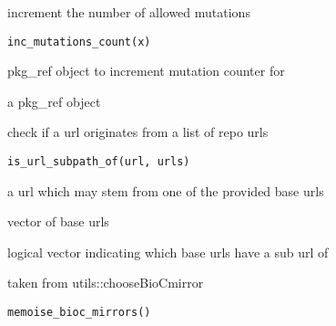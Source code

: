 \documentclass[a4paper]{book}
\begin{document}
%
\begin{Description}
increment the number of allowed mutations
\end{Description}
%
\begin{Usage}
\begin{verbatim}
inc_mutations_count(x)
\end{verbatim}
\end{Usage}
%
\begin{Arguments}
\begin{ldescription}
\item[\code{x}] pkg\_ref object to increment mutation counter for
\end{ldescription}
\end{Arguments}
%
\begin{Value}
a pkg\_ref object
\end{Value}
%
\begin{Description}
check if a url originates from a list of repo urls
\end{Description}
%
\begin{Usage}
\begin{verbatim}
is_url_subpath_of(url, urls)
\end{verbatim}
\end{Usage}
%
\begin{Arguments}
\begin{ldescription}
\item[\code{url}] a url which may stem from one of the provided base urls

\item[\code{urls}] vector of base urls
\end{ldescription}
\end{Arguments}
%
\begin{Value}
logical vector indicating which base urls have a sub url of
\end{Value}
%
\begin{Description}
taken from utils::chooseBioCmirror
\end{Description}
%
\begin{Usage}
\begin{verbatim}
memoise_bioc_mirrors()
\end{verbatim}
\end{Usage}
\end{document}
